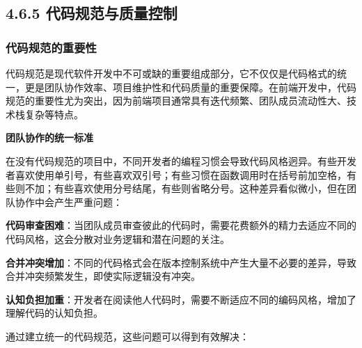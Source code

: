 \subsection{4.6.5 代码规范与质量控制}\label{ux4ee3ux7801ux89c4ux8303ux4e0eux8d28ux91cfux63a7ux5236}

\subsubsection{代码规范的重要性}\label{ux4ee3ux7801ux89c4ux8303ux7684ux91cdux8981ux6027}

代码规范是现代软件开发中不可或缺的重要组成部分，它不仅仅是代码格式的统一，更是团队协作效率、项目维护性和代码质量的重要保障。在前端开发中，代码规范的重要性尤为突出，因为前端项目通常具有迭代频繁、团队成员流动性大、技术栈复杂等特点。

\textbf{团队协作的统一标准}

在没有代码规范的项目中，不同开发者的编程习惯会导致代码风格迥异。有些开发者喜欢使用单引号，有些喜欢双引号；有些习惯在函数调用时在括号前加空格，有些则不加；有些喜欢使用分号结尾，有些则省略分号。这种差异看似微小，但在团队协作中会产生严重问题：

\textbf{代码审查困难}：当团队成员审查彼此的代码时，需要花费额外的精力去适应不同的代码风格，这会分散对业务逻辑和潜在问题的关注。

\textbf{合并冲突增加}：不同的代码格式会在版本控制系统中产生大量不必要的差异，导致合并冲突频繁发生，即使实际逻辑没有冲突。

\textbf{认知负担加重}：开发者在阅读他人代码时，需要不断适应不同的编码风格，增加了理解代码的认知负担。

通过建立统一的代码规范，这些问题可以得到有效解决：

